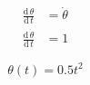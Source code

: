 \documentclass{standalone}
\newcommand{\di}{\textrm{d}\,}
\begin{document}
    \begin{align}
        \frac{\di \theta}{ \di t} &= \dot{\theta} \\
        \frac{\di \dot{\theta} }{ \di t} &= 1
    \end{align}

    \begin{equation}
        \theta(t) = 0.5 t^2
    \end{equation}
\end{document}

